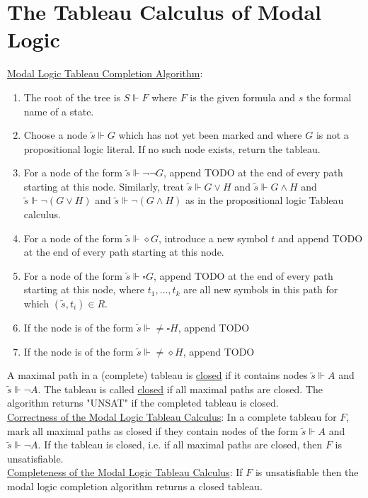 \documentclass[a4paper]{article}
\newcommand{\ul}{\underline}
\begin{document}
\section{The Tableau Calculus of Modal Logic}
\ul{Modal Logic Tableau Completion Algorithm}:
\begin{enumerate}[(1)]
	\item The root of the tree is $S\Vdash F$ where $F$ is the given formula and $s$ the formal name of a state.
	\item Choose a node $\tilde s\Vdash G$ which has not yet been marked and where $G$ is not a propositional logic literal. If no such node exists, return the tableau.
	\item For a node of the form $\tilde s\Vdash \neg\neg G$, append TODO at the end of every path starting at this node. Similarly, treat $\tilde s\Vdash G\vee H$ and $\tilde s\Vdash G\wedge H$ and $\tilde s\Vdash \neg(G\vee H)$ and $\tilde s\Vdash\neg(G\wedge H)$ as in the propositional logic Tableau calculus.
	\item For a node of the form $\tilde s\Vdash \diamond G$, introduce a new symbol $t$ and append TODO at the end of every path starting at this node.
	\item For a node of the form $\tilde s\Vdash \square G$, append TODO at the end of every path starting at this node, where $t_1,\dots,t_k$ are all new symbols in this path for which $(\tilde s, t_i)\in R$.
	\item If the node is of the form $\tilde s\Vdash \neq\square H$, append TODO
	\item If the node is of the form $\tilde s\Vdash \neq\diamond H$, append TODO
\end{enumerate}
A maximal path in a (complete) tableau is \ul{closed} if it contains nodes $\tilde s\Vdash A$ and $\tilde s\Vdash\neg A$. The tableau is called \ul{closed} if all maximal paths are closed. The algorithm returns "UNSAT" if the completed tableau is closed.\\
\ul{Correctness of the Modal Logic Tableau Calculus}: In a complete tableau for $F$, mark all maximal paths as closed if they contain nodes of the form $\tilde s\Vdash A$ and $\tilde s\Vdash\neg A$. If the tableau is closed, i.e. if all maximal paths are closed, then $F$ is unsatisfiable.\\
\ul{Completeness of the Modal Logic Tableau Calculus}: If $F$ is unsatisfiable then the modal logic completion algorithm returns a closed tableau.
\end{document}
